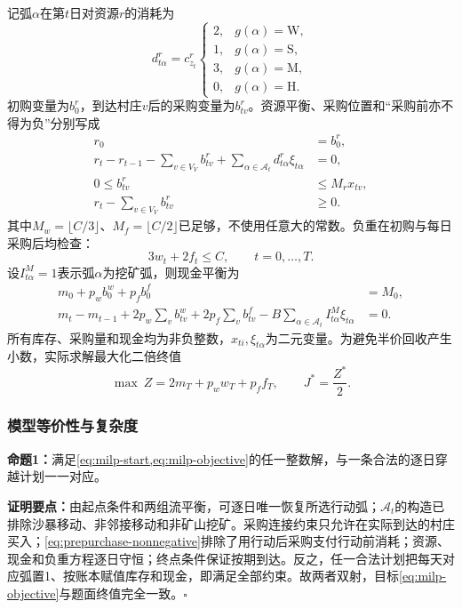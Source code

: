 记弧$\alpha$在第$t$日对资源$r$的消耗为
\begin{equation}
d_{t\alpha}^r=c_{z_t}^r
\begin{cases}
2,&g(\alpha)=\mathrm W,\\
1,&g(\alpha)=\mathrm S,\\
3,&g(\alpha)=\mathrm M,\\
0,&g(\alpha)=\mathrm H.
\end{cases}
\label{eq:arc-consumption}
\end{equation}
初购变量为$b_0^r$，到达村庄$v$后的采购变量为$b_{tv}^r$。资源平衡、采购位置和“采购前亦不得为负”分别写成
\begin{align}
r_0&=b_0^r,\label{eq:initial-resource}\\
r_t-r_{t-1}-\sum_{v\in V_V}b_{tv}^r
+\sum_{\alpha\in\mathcal A_t}d_{t\alpha}^r\xi_{t\alpha}&=0,
\label{eq:milp-resource}\\
0\le b_{tv}^r&\le M_r x_{tv},\label{eq:purchase-link}\\
r_t-\sum_{v\in V_V}b_{tv}^r&\ge0.\label{eq:prepurchase-nonnegative}
\end{align}
其中$M_w=\lfloor C/3\rfloor$、$M_f=\lfloor C/2\rfloor$已足够，不使用任意大的常数。负重在初购与每日采购后均检查：
\begin{equation}
3w_t+2f_t\le C,\qquad t=0,\ldots,T.
\label{eq:milp-capacity}
\end{equation}
设$I_{t\alpha}^{M}=1$表示弧$\alpha$为挖矿弧，则现金平衡为
\begin{align}
m_0+p_wb_0^w+p_fb_0^f&=M_0,\label{eq:milp-cash0}\\
m_t-m_{t-1}+2p_w\sum_vb_{tv}^w+2p_f\sum_vb_{tv}^f
-B\sum_{\alpha\in\mathcal A_t}I_{t\alpha}^{M}\xi_{t\alpha}&=0.
\label{eq:milp-cash}
\end{align}
所有库存、采购量和现金均为非负整数，$x_{ti},\xi_{t\alpha}$为二元变量。为避免半价回收产生小数，实际求解最大化二倍终值
\begin{equation}
\max\ Z=2m_T+p_ww_T+p_ff_T,
\qquad J^*=\frac{Z^*}{2}.
\label{eq:milp-objective}
\end{equation}

\subsubsection{模型等价性与复杂度}

\textbf{命题1：}满足\cref{eq:milp-start,eq:milp-objective}的任一整数解，与一条合法的逐日穿越计划一一对应。

\textbf{证明要点：}由起点条件和两组流平衡，可逐日唯一恢复所选行动弧；$\mathcal A_t$的构造已排除沙暴移动、非邻接移动和非矿山挖矿。采购连接约束只允许在实际到达的村庄买入；\cref{eq:prepurchase-nonnegative}排除了用行动后采购支付行动前消耗；资源、现金和负重方程逐日守恒；终点条件保证按期到达。反之，任一合法计划把每天对应弧置1、按账本赋值库存和现金，即满足全部约束。故两者双射，目标\cref{eq:milp-objective}与题面终值完全一致。\hfill$\square$

